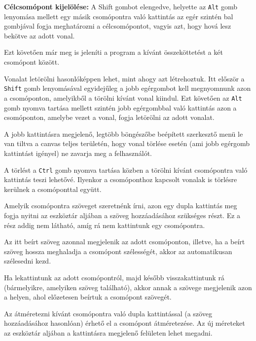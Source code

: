 \textbf{Célcsomópont kijelölése:} A Shift gombot elengedve, helyette az \texttt{Alt} gomb lenyomása mellett egy másik csomópontra való kattintás az egér szintén bal gombjával fogja meghatározni a célcsomópontot, vagyis azt, hogy hová lesz bekötve az adott vonal.

Ezt követően már meg is jeleníti a program a kívánt összeköttetést a két csomópont között.


Vonalat letörölni hasonlóképpen lehet, mint ahogy azt létrehoztuk. Itt először a \texttt{Shift} gomb lenyomásával egyidejűleg a jobb egérgombot kell megnyomnunk azon a csomóponton, amelyikből a törölni kívánt vonal kiindul. Ezt követően az \texttt{Alt} gomb nyomva tartása mellett szintén jobb egérgombbal való kattintás azon a csomóponton, amelybe vezet a vonal, fogja letörölni az adott vonalat.

A jobb kattintásra megjelenő, legtöbb böngészőbe beépített szerkesztő menü le van tiltva a canvas teljes területén, hogy vonal törlése esetén (ami jobb egérgomb kattintást igényel) ne zavarja meg a felhasználót.


A törlést a \texttt{Ctrl} gomb nyomva tartása közben a törölni kívánt csomópontra való kattintás teszi lehetővé. Ilyenkor a csomóponthoz kapcsolt vonalak is törlésre kerülnek a csomóponttal együtt.


Amelyik csomópontra szöveget szeretnénk írni, azon egy dupla kattintás meg fogja nyitni az eszköztár aljában a szöveg hozzáadásához szükséges részt. Ez a rész addig nem látható, amíg rá nem kattintunk egy csomópontra.

Az itt beírt szöveg azonnal megjelenik az adott csomóponton, illetve, ha a beírt szöveg hossza meghaladja a csomópont szélességét, akkor az automatikusan szélesedni kezd.

Ha lekattintunk az adott csomópontról, majd később visszakattintunk rá (bármelyikre, amelyiken szöveg található), akkor annak a szövege megjelenik azon a helyen, ahol előzetesen beírtuk a csomópont szövegét.


Az átméretezni kívánt csomópontra való dupla kattintással (a szöveg hozzáadásához hasonlóan) érhető el a csomópont átméretezése. Az új méreteket az eszköztár aljában a kattintásra megjelenő felületen lehet megadni.

